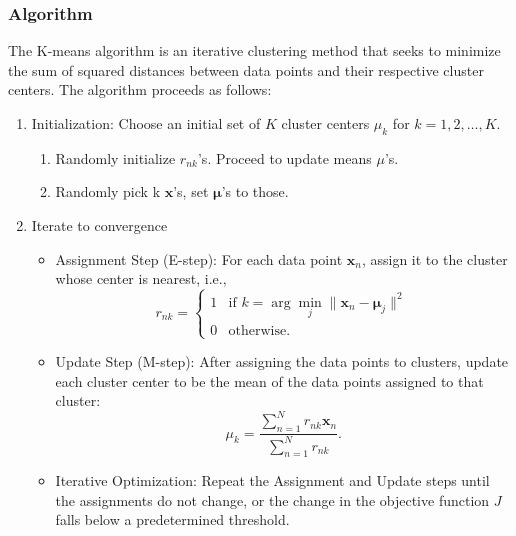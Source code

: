 \subsubsection{Algorithm}
\begin{definition}
The K-means algorithm is an iterative clustering method that seeks to minimize the sum of squared distances between data points and their respective cluster centers. The algorithm proceeds as follows:

\begin{enumerate}
    \item Initialization: Choose an initial set of \( K \) cluster centers \( \mu_k \) for \( k = 1, 2, \dots, K \).
    \begin{enumerate}
        \item Randomly initialize $r_{nk}$'s. Proceed to update means $\mu$'s.
        \item Randomly pick k $\mathbf{x}$'s, set $\mathbf{\mu}$'s to those. 
    \end{enumerate}
    
    \item Iterate to convergence 
    \begin{itemize}
        \item Assignment Step (E-step): For each data point \( \mathbf{x}_n \), assign it to the cluster whose center is nearest, i.e., 
        \[
        r_{nk} = 
        \begin{cases} 
        1 & \text{if } k = \arg \min_j \| \mathbf{x}_n - \mathbf{\mu}_j \|^2 \\
        0 & \text{otherwise.}
        \end{cases}
        \]
        
        \item Update Step (M-step): After assigning the data points to clusters, update each cluster center to be the mean of the data points assigned to that cluster:
        \[
        \mu_k = \frac{\sum_{n=1}^{N} r_{nk} \mathbf{x}_n}{\sum_{n=1}^{N} r_{nk}}.
        \]
        
        \item Iterative Optimization: Repeat the Assignment and Update steps until the assignments do not change, or the change in the objective function \( J \) falls below a predetermined threshold. 
    \end{itemize}
\end{enumerate}
\end{definition}

